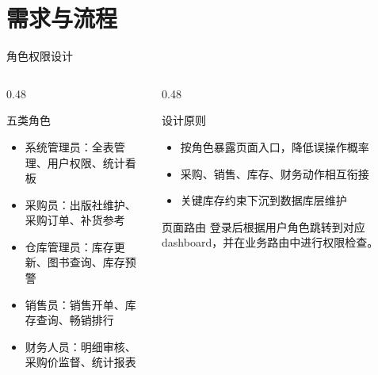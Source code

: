\documentclass{beamer}
\newcommand{\smallitems}{\setlength{\itemsep}{0.18em}\footnotesize}
\begin{document}
\section{需求与流程}

\begin{frame}{角色权限设计}
  \begin{columns}[T]
    \begin{column}{0.48\textwidth}
      \begin{block}{五类角色}
        \smallitems
        \begin{itemize}
          \item 系统管理员：全表管理、用户权限、统计看板
          \item 采购员：出版社维护、采购订单、补货参考
          \item 仓库管理员：库存更新、图书查询、库存预警
          \item 销售员：销售开单、库存查询、畅销排行
          \item 财务人员：明细审核、采购价监督、统计报表
        \end{itemize}
      \end{block}
    \end{column}
    \begin{column}{0.48\textwidth}
      \begin{block}{设计原则}
        \smallitems
        \begin{itemize}
          \item 按角色暴露页面入口，降低误操作概率
          \item 采购、销售、库存、财务动作相互衔接
          \item 关键库存约束下沉到数据库层维护
        \end{itemize}
      \end{block}
      \begin{block}{页面路由}
        \small
        登录后根据用户角色跳转到对应 dashboard，并在业务路由中进行权限检查。
      \end{block}
    \end{column}
  \end{columns}
\end{frame}
\end{document}
